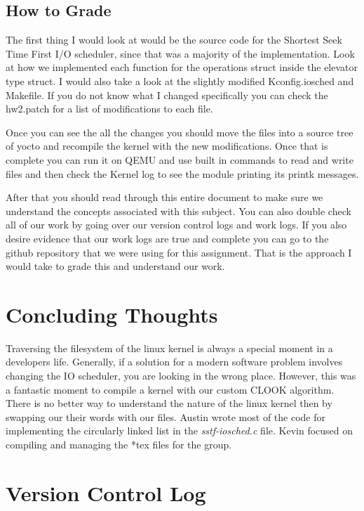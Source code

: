 \documentclass[onecolumn, draftclsnofoot,10pt, compsoc]{IEEEtran}
\begin{document}
        \subsection{How to Grade}
        		The first thing I would look at would be the source code for the Shortest Seek Time First I/O scheduler, since that was a majority of the implementation. Look at how we implemented each function for the operations struct inside the elevator type struct. I would also take a look at the slightly modified Kconfig.iosched and Makefile. If you do not know what I changed specifically you can check the hw2.patch for a list of modifications to each file.
                
                Once you can see the all the changes you should move the files into a source tree of yocto and recompile the kernel with the new modifications. Once that is complete you can run it on QEMU and use built in commands to read and write files and then check the Kernel log to see the module printing its printk messages.
                
                After that you should read through this entire document to make sure we understand the concepts associated with this subject. You can also double check all of our work by going over our version control logs and work logs. If you also desire evidence that our work logs are true and complete you can go to the github repository that we were using for this assignment\cite{our-github:5}. That is the approach I would take to grade this and understand our work.
        
        \section{Concluding Thoughts}
        Traversing the filesystem of the linux kernel is always a special moment in a developers life. Generally, if a solution for a modern software problem involves changing the IO scheduler, you are looking in the wrong place. However, this was a fantastic moment to compile a kernel with our custom CLOOK algorithm. There is no better way to understand the nature of the linux kernel then by swapping our their words with our files. Austin wrote most of the code for implementing the circularly linked list in the \textit{sstf-iosched.c} file. Kevin focused on compiling and managing the *tex files for the group. 
        \section{Version Control Log}
        
\end{document}

